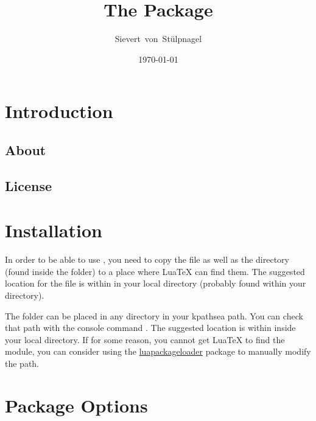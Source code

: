 \documentclass{ltxdockit}
\title{The \sty{transconv} Package}
\author{Sievert\ von\ St\"{u}lpnagel}
\date{\today}
\begin{document}
\maketitle

\tableofcontents
\listoftables

\section{Introduction}\label{int}

\subsection[About]{About }

\subsection{License}

\section{Installation}

In order to be able to use , you need to copy the
 file as well as the  directory (found inside
the  folder) to a place where Lua\TeX{} can find them. The suggested
location for the  file is within  in your local
 directory (probably found within your  directory).

The  folder can be placed in any directory in your kpathsea path.
You can check that path with the console command . The suggested location is within  inside your
local  directory. If for some reason, you cannot get Lua\TeX{} to
find the module, you can consider using the
\href{https://www.ctan.org/pkg/luapackageloader}{luapackageloader} package to
manually modify the path.

\section{Package Options}
\end{document}
